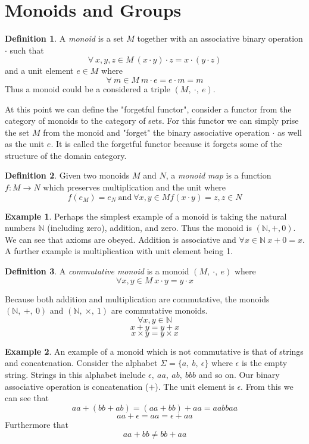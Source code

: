\documentclass{article}
\theoremstyle{definition}
\newtheorem{definition}{Definition}[section]
\newtheorem{example}{Example}[section]
\begin{document}
\pagebreak
\section{Monoids and Groups}

\begin{definition}
    A \textit{monoid} is a set $M$ together with an associative binary operation $\cdot$ such that
    $$\forall\ x, y, z \in M\ (x \cdot y) \cdot z = x \cdot (y \cdot z)$$
    and a unit element $e \in M$ where
    $$\forall\ m \in M\ m \cdot e = e \cdot m = m$$
    Thus a monoid could be a considered a triple $(M,\ \cdot,\ e)$.
\end{definition}

At this point we can define the "forgetful functor", consider a functor from the
category of monoids to the category of sets. For this functor we can simply prise the
set $M$ from the monoid and "forget" the binary associative operation $\cdot$ as well as
the unit $e$. It is called the forgetful functor because it forgets some of the structure of
the domain category.

\begin{definition}
    Given two monoids $M$ and $N$, a \textit{monoid map} is a function $f : M \rightarrow N$
    which preserves multiplication and the unit where
    $$f(e_M) = e_N\ \textrm{and}\ \forall x, y \in M f(x \cdot y) = z, z \in N$$
\end{definition}

\begin{example}
    Perhaps the simplest example of a monoid is taking the natural numbers $\mathbb{N}$
    (including zero), addition, and zero.
    Thus the monoid is $(\mathbb{N}, +, 0)$. We can see that axioms
    are obeyed. Addition is associative and $\forall x \in \mathbb{N}\ x + 0 = x$.
    A further example is multiplication with unit element being 1.
\end{example}

\begin{definition}
    A \textit{commutative monoid} is a monoid $(M,\ \cdot,\ e)$ where
    $$\forall x, y \in M\ x \cdot y = y \cdot x$$
\end{definition}

Because both addition and multiplication are commutative, the monoids $(\mathbb{N},\ +,\ 0)$
and $(\mathbb{N},\ \times,\ 1)$ are commutative monoids.
$$ \forall x, y \in \mathbb{N}$$
$$x + y = y + x$$
$$x \times y = y \times x$$

\begin{example}
    An example of a monoid which is not commutative is that of strings and concatenation.
    Consider the alphabet $\Sigma = \{a,\ b,\ \epsilon\}$ where $\epsilon$ is the empty string.
    Strings in this alphabet include $\epsilon,\ aa,\ ab,\ bbb$ and so on.
    Our binary associative operation is concatenation ($+$).
    The unit element is $\epsilon$.
    From this we can see that
    $$aa + (bb + ab) = (aa + bb) + aa = aabbaa$$
    $$aa + \epsilon = aa = \epsilon + aa$$
    Furthermore that
    $$aa + bb \ne bb + aa$$
\end{example}
\end{document}

